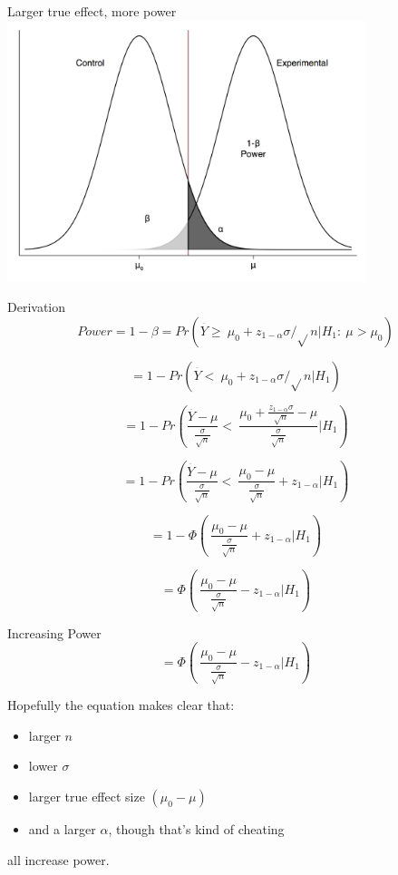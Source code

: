 \documentclass{beamer}
\begin{document}
\begin{frame}{Larger true effect, more power}
\includegraphics[height=3in]{../Images/powerfig3.png}
\end{frame}


\begin{frame}{Derivation}
\[Power = 1 - \beta = Pr(\overset{\overline{}}{Y} \geq \ \mu_{0} + z_{1 - \alpha}\sigma/\sqrt{}n|H_{1}:\ \mu > \mu_{0})\]

\[= 1 - Pr(\overset{\overline{}}{Y} < \ \mu_{0} + z_{1 - \alpha}\sigma/\sqrt{}n|H_{1})\]

\[= 1 - Pr(\frac{\overset{\overline{}}{Y} - \mu}{\frac{\sigma}{\sqrt{n}}} < \ \frac{\mu_{0} + \frac{z_{1 - \alpha}\sigma}{\sqrt{n}} - \mu}{\frac{\sigma}{\sqrt{n}}}|H_{1})\]

\[= 1 - Pr(\frac{\overset{\overline{}}{Y} - \mu}{\frac{\sigma}{\sqrt{n}}} < \ \frac{\mu_{0} - \mu}{\frac{\sigma}{\sqrt{n}}} + z_{1 - \alpha}|H_{1})\]

\[= 1 - \Phi(\ \frac{\mu_{0} - \mu}{\frac{\sigma}{\sqrt{n}}} + z_{1 - \alpha}|H_{1})\]

\[= \Phi(\ \frac{\mu_{0} - \mu}{\frac{\sigma}{\sqrt{n}}} - z_{1 - \alpha}|H_{1})\]
\end{frame}

\begin{frame}{Increasing Power}
\[= \Phi(\ \frac{\mu_{0} - \mu}{\frac{\sigma}{\sqrt{n}}} - z_{1 - \alpha}|H_{1})\]

Hopefully the equation makes clear that:
\begin{itemize}
\item larger $n$
\item lower $\sigma$
\item larger true effect size $(\mu_0-\mu)$
\item and a larger $\alpha$, though that's kind of cheating
\end{itemize}
 all increase power.
\end{frame}
\end{document}
